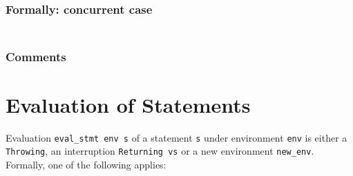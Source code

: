 \documentclass{book}
\begin{document}
  \subsection{Formally: concurrent case}
  \begin{align}
  \end{align} 

    \subsection{Comments}

\chapter{Evaluation of Statements \label{chap:eval_stmt}}
Evaluation \texttt{eval\_stmt env s} of a statement \texttt{s} under
environment \texttt{env} is either a \texttt{Throwing}, an interruption
\texttt{Returning vs} or a new environment \texttt{new\_env}. Formally, one of
the following applies:
\end{document}
